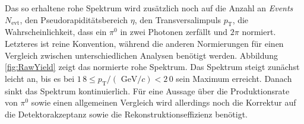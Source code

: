 \newline
Das so erhaltene rohe Spektrum wird zusätzlich noch auf die Anzahl an \textit{Events} $N_\text{evt}$, den Pseudorapiditätsbereich $\eta$, den Transversalimpuls $p_\text{T}$, die Wahrscheinlichkeit, dass ein $\pi^{0}$ in zwei Photonen zerfällt und $2\pi$ normiert.
Letzteres ist reine Konvention, während die anderen Normierungen für einen Vergleich zwischen unterschiedlichen Analysen benötigt werden.
Abbildung \ref{fig:RawYield} zeigt das normierte rohe Spektrum.
Das Spektrum steigt zunächst leicht an, bis es bei $1\,8 \leq p_{\text{T}}/(\text{ GeV}/c) < 2\,0$ sein Maximum erreicht.
Danach sinkt das Spektrum kontinuierlich.
\newline
Für eine Aussage über die Produktionsrate von $\pi^{0}$ sowie einen allgemeinen Vergleich wird allerdings noch die Korrektur auf die Detektorakzeptanz sowie die Rekonstruktionseffizienz benötigt.